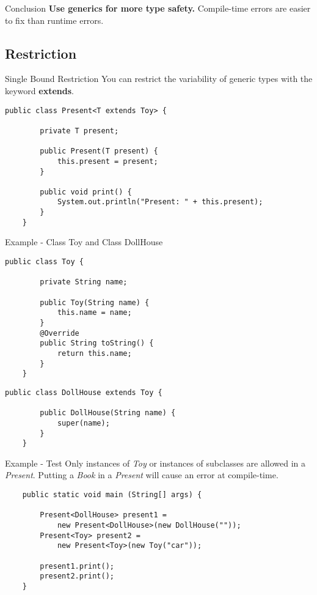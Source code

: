\begin{frame}[fragile]{Conclusion}
	\textbf{Use generics for more type safety.}
	\vfill
	Compile-time errors are easier to fix than runtime errors.
\end{frame}

\subsection{Restriction}
\begin{frame}[fragile]{Single Bound Restriction}
	You can restrict the variability of generic types with the keyword \textbf{extends}.
	\begin{lstlisting}[basicstyle=\ttfamily\scriptsize]
	public class Present<T extends Toy> {
	    
	    private T present;
	    
	    public Present(T present) {
	        this.present = present;
	    }
	    
	    public void print() {
	        System.out.println("Present: " + this.present);
	    }
	}
	\end{lstlisting}	
\end{frame}

\begin{frame}[fragile]{Example - Class Toy and Class DollHouse}
	\begin{lstlisting}[escapechar=!, basicstyle=\ttfamily\scriptsize]
	public class Toy {
	    
	    private String name;
	    
	    public Toy(String name) {
	        this.name = name;
	    }
	    @Override
	    public String toString() {
	        return this.name;
	    }
	}
	\end{lstlisting}
	\begin{lstlisting}[basicstyle=\ttfamily\scriptsize]
	public class DollHouse extends Toy {
	    
	    public DollHouse(String name) {
	        super(name);
	    }
	}
	\end{lstlisting}
\end{frame}

\begin{frame}[fragile]{Example - Test}
	Only instances of \emph{Toy} or instances of subclasses are allowed in a \emph{Present}.
	Putting a \emph{Book} in a \emph{Present} will cause an error at compile-time.
	\begin{lstlisting}
	public static void main (String[] args) {
	    
	    Present<DollHouse> present1 = 
	        new Present<DollHouse>(new DollHouse("")); 
	    Present<Toy> present2 = 
	        new Present<Toy>(new Toy("car"));
	    
	    present1.print();
	    present2.print();
	}
	\end{lstlisting}
\end{frame}


